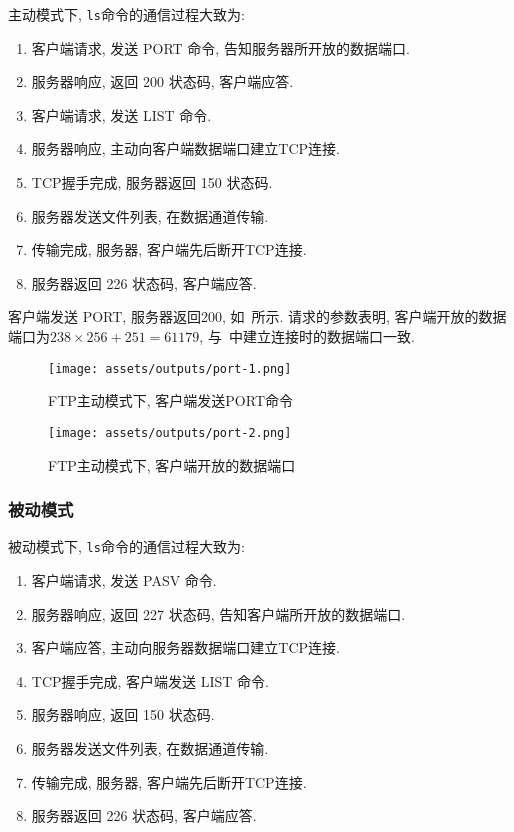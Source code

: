 \documentclass{ned-article}
\begin{document}
主动模式下, \texttt{ls}命令的通信过程大致为:
\begin{enumerate}[noitemsep]
    \item 客户端请求, 发送 PORT 命令, 告知服务器所开放的数据端口.
    \item 服务器响应, 返回 200 状态码, 客户端应答.
    \item 客户端请求, 发送 LIST 命令.
    \item 服务器响应, 主动向客户端数据端口建立TCP连接.
    \item TCP握手完成, 服务器返回 150 状态码.
    \item 服务器发送文件列表, 在数据通道传输.
    \item 传输完成, 服务器, 客户端先后断开TCP连接.
    \item 服务器返回 226 状态码, 客户端应答.
\end{enumerate}

客户端发送 PORT, 服务器返回200, 如~所示. 请求的参数表明, 客户端开放的数据端口为$238 \times 256 + 251 = 61179$, 与~中建立连接时的数据端口一致.

\begin{figure}[H]
    \centering
    \texttt{[image: assets/outputs/port-1.png]}
    \caption{FTP主动模式下, 客户端发送PORT命令}\label{fig:port-1}
\end{figure}

\begin{figure}[H]
    \centering
    \texttt{[image: assets/outputs/port-2.png]}
    \caption{FTP主动模式下, 客户端开放的数据端口}\label{fig:port-2}
\end{figure}

\subsubsection{被动模式}

被动模式下, \texttt{ls}命令的通信过程大致为:
\begin{enumerate}[noitemsep]
    \item 客户端请求, 发送 PASV 命令.
    \item 服务器响应, 返回 227 状态码, 告知客户端所开放的数据端口.
    \item 客户端应答, 主动向服务器数据端口建立TCP连接.
    \item TCP握手完成, 客户端发送 LIST 命令.
    \item 服务器响应, 返回 150 状态码.
    \item 服务器发送文件列表, 在数据通道传输.
    \item 传输完成, 服务器, 客户端先后断开TCP连接.
    \item 服务器返回 226 状态码, 客户端应答.
\end{enumerate}
\end{document}
